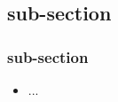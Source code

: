 \documentclass[slidetop,11pt]{beamer}
\begin{document}
\subsection{sub-section}
\begin{frame}
	\frametitle{sub-section}
	\begin{itemize}
		\item ...
	\end{itemize}
\end{frame}

\end{document}
